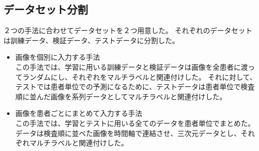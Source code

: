 \subsection{データセット分割}
２つの手法に合わせてデータセットを２つ用意した。
それぞれのデータセットは訓練データ、検証データ、テストデータに分割した。
\begin{itemize}
    \item 画像を個別に入力する手法\\
この手法では、学習に用いる訓練データと検証データは画像を全患者に渡ってランダムにし、それぞれをマルチラベルと関連付けした。
それに対して、テストでは患者単位での予測になるために、テストデータは患者単位で検査順に並んだ画像を系列データとしてマルチラベルと関連付けした。
    \item 画像を患者ごとにまとめて入力する手法\\
この手法では、学習とテストに用いる全てのデータを患者単位でまとめた。
データは検査順に並べた画像を時間軸で連結させ、三次元データとし、それぞれマルチラベルと関連付けした。
\end{itemize}

